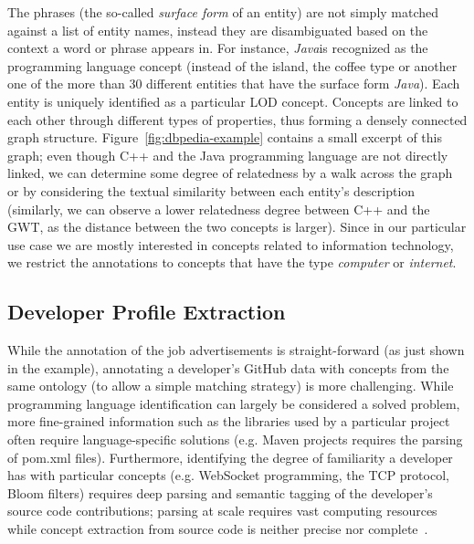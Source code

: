 \documentclass[conference]{IEEEtran}
\begin{document}
The
phrases (the so-called \emph{surface form} of an entity) are not simply matched
against a list of entity names, instead they are disambiguated based on the
context a word or phrase appears in. For instance, \emph{Java}is recognized as
the programming language concept (instead of the island, the coffee type or
another one of the more than 30 different entities that have the surface form
\emph{Java}). Each entity is uniquely identified as a particular LOD concept.
Concepts are linked to each other through different types
of properties, thus forming a densely connected graph structure.
Figure~\ref{fig:dbpedia-example} contains a small excerpt of this graph; even
though C++ and the Java programming language are not directly linked, we can
determine some degree of relatedness by a walk across the graph or by considering the textual similarity between each entity's description~\cite{gabrilovich2007computing} (similarly, we
can observe a lower relatedness degree between C++ and the GWT, as the distance
between the two concepts is larger). Since in our particular use
case we are mostly interested in concepts related to information technology, we
restrict the annotations to concepts that have the type \emph{computer} or
\emph{internet}.

\subsection{Developer Profile Extraction}

While the annotation of the job advertisements is straight-forward (as just shown in the example), annotating a developer's GitHub data with concepts from the same ontology (to allow a simple
matching strategy) is more challenging. While programming language
identification can largely be considered a solved problem, more fine-grained
information such as the libraries used by a particular project often require
language-specific solutions (e.g. Maven projects requires the parsing of
\textsf{pom.xml} files). Furthermore, identifying the degree of familiarity a
developer has with particular concepts (e.g. WebSocket programming, the TCP
protocol, Bloom filters) requires deep parsing and semantic tagging of the
developer's source code contributions; parsing at scale requires vast computing
resources while concept extraction from source code is neither precise nor complete~\cite{Kuhn07}.
\end{document}
